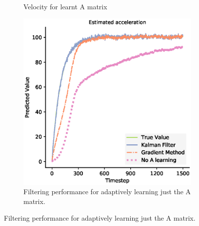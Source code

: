 \begin{figure}[H]
\begin{subfigure}{0.49\textwidth}
 \caption{Velocity for learnt A matrix}
 \end{subfigure}
 \begin{subfigure}{0.49\textwidth}\quad
 \centering
 \includegraphics[width=.95\linewidth]{chapter_3_figures/Estimated_acceleration_A_matrix.eps}
 \caption{Filtering performance for adaptively learning just the A matrix.}
 \end{subfigure}
 \end{figure}
 
